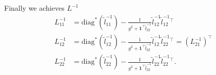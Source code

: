 \documentclass[final,onefignum,onetabnum]{siamart190516}
\begin{document}
Finally we achieves $L^{-1}$
\begin{equation}\label{L_inv_formula}
    \begin{aligned}
        L^{-1}_{11} &= \text{diag}^*(\widetilde{l}^{-1}_{11}) - \frac{1}{g^2+\mathbf{1}^\top \widetilde{l}^{-1}_{22}}\widetilde{l}^{-1}_{12}\widetilde{l}^{-1}_{12}^\top\\
        L^{-1}_{12} &= \text{diag}^*(\widetilde{l}^{-1}_{12}) - \frac{1}{g^2+\mathbf{1}^\top \widetilde{l}^{-1}_{22}}\widetilde{l}^{-1}_{12}\widetilde{l}^{-1}_{22}^\top = (L^{-1}_{21})^{\top}\\
        L^{-1}_{22} &= \text{diag}^*(\widetilde{l}^{-1}_{22}) - \frac{1}{g^2+\mathbf{1}^\top \widetilde{l}^{-1}_{22}}\widetilde{l}^{-1}_{22}\widetilde{l}^{-1}_{22}^\top.
    \end{aligned}
\end{equation}
\end{document}
